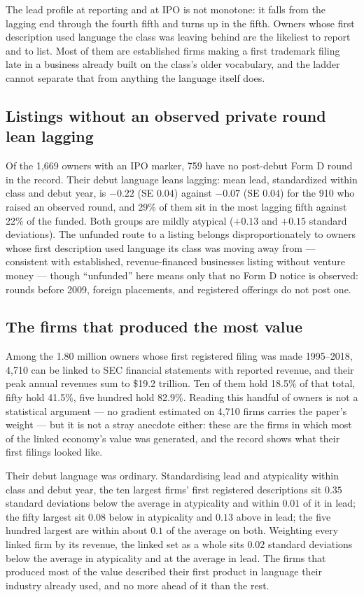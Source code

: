 The lead profile at reporting and at IPO is not monotone: it falls from
the lagging end through the fourth fifth and turns up in the fifth. Owners
whose first description used language the class was leaving behind are the
likeliest to report and to list. Most of them are established firms making
a first trademark filing late in a business already built on the class's
older vocabulary, and the ladder cannot separate that from anything the
language itself does.

\subsection{Listings without an observed private round lean lagging}\label{sec:unfunded_ipo}

Of the 1{,}669 owners with an IPO marker, 759 have no post-debut Form D
round in the record. Their debut language leans lagging: mean lead,
standardized within class and debut year, is $-0.22$ (SE $0.04$) against
$-0.07$ (SE $0.04$) for the 910 who raised an observed round, and 29\% of
them sit in the most lagging fifth against 22\% of the funded. Both groups
are mildly atypical ($+0.13$ and $+0.15$ standard deviations). The
unfunded route to a listing belongs disproportionately to owners whose
first description used language its class was moving away from ---
consistent with established, revenue-financed businesses listing without
venture money --- though ``unfunded'' here means only that no Form D
notice is observed: rounds before 2009, foreign placements, and registered
offerings do not post one.

\subsection{The firms that produced the most value}\label{sec:value}

Among the 1.80 million owners whose first registered filing was made
1995--2018, 4{,}710 can be linked to SEC financial statements with
reported revenue, and their peak annual revenues sum to \$19.2 trillion.
Ten of them hold 18.5\% of that total, fifty hold 41.5\%, five hundred
hold 82.9\%. Reading this handful of owners is not a statistical argument
--- no gradient estimated on 4{,}710 firms carries the paper's weight ---
but it is not a stray anecdote either: these are the firms in which most
of the linked economy's value was generated, and the record shows what
their first filings looked like.

Their debut language was ordinary. Standardising lead and atypicality
within class and debut year, the ten largest firms' first registered
descriptions sit $0.35$ standard deviations below the average in
atypicality and within $0.01$ of it in lead; the fifty largest sit $0.08$
below in atypicality and $0.13$ above in lead; the five hundred largest
are within about $0.1$ of the average on both. Weighting every linked firm
by its revenue, the linked set as a whole sits $0.02$ standard deviations
below the average in atypicality and at the average in lead. The firms
that produced most of the value described their first product in language
their industry already used, and no more ahead of it than the rest.

